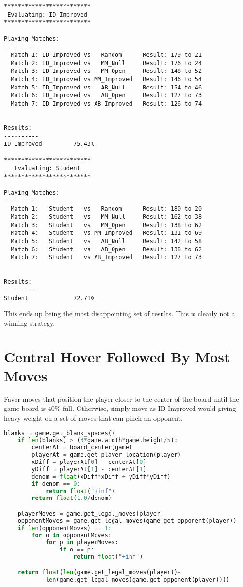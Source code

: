 \documentclass[10pt, a4paper]{article}
\begin{document}
\begin{verbatim}
*************************
 Evaluating: ID_Improved 
*************************

Playing Matches:
----------
  Match 1: ID_Improved vs   Random    	Result: 179 to 21
  Match 2: ID_Improved vs   MM_Null   	Result: 176 to 24
  Match 3: ID_Improved vs   MM_Open   	Result: 148 to 52
  Match 4: ID_Improved vs MM_Improved 	Result: 146 to 54
  Match 5: ID_Improved vs   AB_Null   	Result: 154 to 46
  Match 6: ID_Improved vs   AB_Open   	Result: 127 to 73
  Match 7: ID_Improved vs AB_Improved 	Result: 126 to 74


Results:
----------
ID_Improved         75.43%

*************************
   Evaluating: Student   
*************************

Playing Matches:
----------
  Match 1:   Student   vs   Random    	Result: 180 to 20
  Match 2:   Student   vs   MM_Null   	Result: 162 to 38
  Match 3:   Student   vs   MM_Open   	Result: 138 to 62
  Match 4:   Student   vs MM_Improved 	Result: 131 to 69
  Match 5:   Student   vs   AB_Null   	Result: 142 to 58
  Match 6:   Student   vs   AB_Open   	Result: 138 to 62
  Match 7:   Student   vs AB_Improved 	Result: 127 to 73


Results:
----------
Student             72.71%
\end{verbatim}

This ends up being the most disappointing set of results.  This is clearly not
a winning strategy.

\section{Central Hover Followed By Most Moves}

Favor moves that position the player closer to the center of the board until the game board is 40\% full.
Otherwise, simply move as ID Improved would giving heavy weight on a set of moves that can pinch an opponent.

\begin{lstlisting}[language=Python]
    blanks = game.get_blank_spaces()
    if len(blanks) > (3*game.width*game.height/5):
        centerAt = board_center(game)
        playerAt = game.get_player_location(player)
        xDiff = playerAt[0] - centerAt[0]
        yDiff = playerAt[1] - centerAt[1]
        denom = float(xDiff*xDiff + yDiff*yDiff)
        if denom == 0:
            return float("+inf")
        return float(1.0/denom)

    playerMoves = game.get_legal_moves(player)
    opponentMoves = game.get_legal_moves(game.get_opponent(player))
    if len(opponentMoves) == 1:
        for o in opponentMoves:
            for p in playerMoves:
                if o == p:
                    return float("+inf")

    return float(len(game.get_legal_moves(player))-
			len(game.get_legal_moves(game.get_opponent(player))))
\end{lstlisting}
\end{document}
